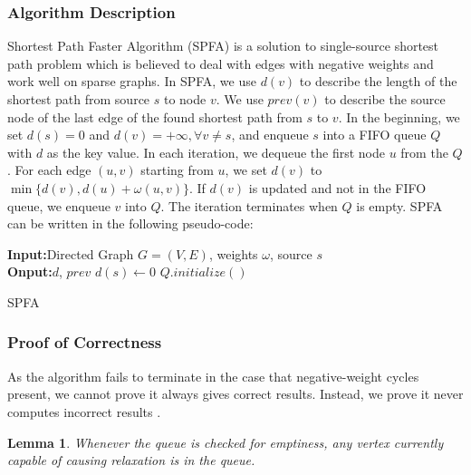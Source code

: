 \documentclass[a4paper, margin=15in]{article}
\renewcommand{\KwData}{\textbf{Input:}}
\renewcommand{\KwResult}{\textbf{Onput:}}
\newtheorem{lemma}{Lemma}
\begin{document}
\subsubsection{Algorithm Description}
Shortest Path Faster Algorithm (SPFA) is a solution to single-source shortest path problem which is believed to deal with edges with negative weights and work well on sparse graphs. In SPFA, we use $d(v)$ to describe the length of the shortest path from source $s$ to node $v$. We use $prev(v)$ to describe the source node of the last edge of the found shortest path from $s$ to $v$. In the beginning, we set $d(s)=0$ and $d(v) = +\infty , \forall v \neq s$, and enqueue $s$ into a FIFO queue $Q$ with $d$ as the key value. In each iteration, we dequeue the first node $u$ from the $Q$. For each edge $(u,v)$ starting from $u$, we set $d(v)$ to $\min\{d(v),d(u)+\omega(u,v)\}$. If $d(v)$ is updated and not in the FIFO queue, we enqueue $v$ into $Q$. The iteration terminates when $Q$ is empty. SPFA can be written in the following pseudo-code:


\begin{algorithm}[H]
 \KwData{Directed Graph $G=(V,E)$, weights $\omega$, source $s$}\\
 \KwResult{$d$, $prev$}\;
 $d(s) \gets 0$\;
 $Q.initialize()$\;
 \caption{SPFA}
\end{algorithm}

\subsubsection{Proof of Correctness}
As the algorithm fails to terminate in the case that negative-weight cycles present, we cannot prove it always gives correct results. Instead, we prove it never computes incorrect results \cite{Shortest73:online}.

\begin{lemma}
Whenever the queue is checked for emptiness, any vertex currently capable of causing relaxation is in the queue.
\end{lemma}
\end{document}
